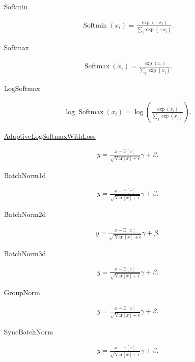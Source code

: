 Softmin

\begin{align}
    \operatorname{Softmin}\left (x_{i}\right)=\frac{\exp \left (-x_{i}\right)}{\sum_{j} \exp \left (-x_{j}\right)}.
\end{align}

Softmax

\begin{align}
    \operatorname{Softmax}\left (x_{i}\right)=\frac{\exp \left (x_{i}\right)}{\sum_{j} \exp \left (x_{j}\right)}.
\end{align}

LogSoftmax

\begin{align}
    \log \operatorname{Softmax}\left (x_{i}\right)=\log \left (\frac{\exp \left (x_{i}\right)}{\sum_{j} \exp \left (x_{j}\right)}\right).
\end{align}


\href{https://pytorch.org/docs/stable/nn.html#torch.nn.Softshrink}{AdaptiveLogSoftmaxWithLoss}

\begin{align}
    y=\frac{x-\mathrm{E}[x]}{\sqrt{\mathrm{Var}[x]+\epsilon}}  \gamma+\beta.
\end{align}

BatchNorm1d

\begin{align}
    y=\frac{x-\mathrm{E}[x]}{\sqrt{\mathrm{Var}[x]+\epsilon}}  \gamma+\beta.
\end{align}

BatchNorm2d

\begin{align}
    y=\frac{x-\mathrm{E}[x]}{\sqrt{\operatorname{Var}[x]+\epsilon}}  \gamma+\beta.
\end{align}

BatchNorm3d

\begin{align}
    y=\frac{x-\mathrm{E}[x]}{\sqrt{\mathrm{Var}[x]+\epsilon}}  \gamma+\beta.
\end{align}

GroupNorm

\begin{align}
    y=\frac{x-\mathrm{E}[x]}{\sqrt{\mathrm{Var}[x]+\epsilon}}  \gamma+\beta.
\end{align}

SyncBatchNorm

\begin{align}
    y=\frac{x-\mathrm{E}[x]}{\sqrt{\mathrm{Var}[x]+\epsilon}}  \gamma+\beta.
\end{align}

